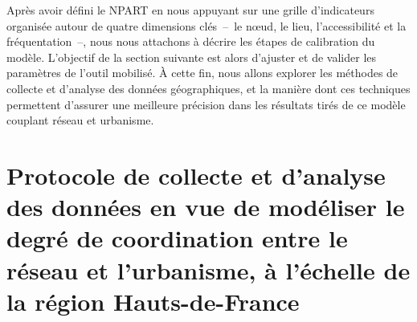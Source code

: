 \begin{refsegment}
Après avoir défini le \acrshort{NPART} en nous appuyant sur une grille d’indicateurs organisée autour de quatre dimensions clés~–~le nœud, le lieu, l'accessibilité et la fréquentation~–, nous nous attachons à décrire les étapes de calibration du modèle. L'objectif de la section suivante est alors d'ajuster et de valider les paramètres de l'outil mobilisé. À cette fin, nous allons explorer les méthodes de collecte et d'analyse des données géographiques, et la manière dont ces techniques permettent d'assurer une meilleure précision dans les résultats tirés de ce modèle couplant réseau et urbanisme.%

    \newpage
\section{Protocole de collecte et d'analyse des données en vue de modéliser le degré de coordination entre le réseau et l'urbanisme, à l’échelle de la région Hauts-de-France
    \label{chap6:methodologie-m-tod-index}
    }


\end{refsegment}
